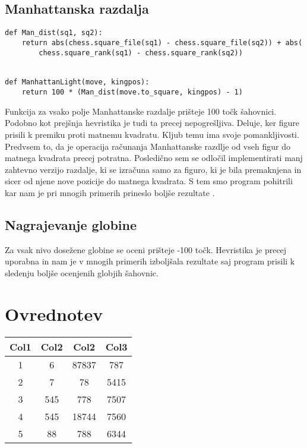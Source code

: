 \documentclass[runningheads]{llncs}
\begin{document}
\subsection{Manhattanska razdalja}
\begin{lstlisting}
def Man_dist(sq1, sq2):
    return abs(chess.square_file(sq1) - chess.square_file(sq2)) + abs(
        chess.square_rank(sq1) - chess.square_rank(sq2))


def ManhattanLight(move, kingpos):
    return 100 * (Man_dist(move.to_square, kingpos) - 1)
\end{lstlisting}
Funkcija za vsako polje Manhattanske razdalje prišteje 100 točk šahovnici. Podobno kot prejšnja hevristika je tudi ta precej nepogrešljiva. Deluje, ker figure prisili k premiku proti matnemu kvadratu. Kljub temu ima svoje pomankljivosti. Predvsem to, da je operacija računanja Manhattanske razdlje od vseh figur do matnega kvadrata precej potratna. Posledično sem se odločil implementirati manj zahtevno verzijo razdalje, ki se izračuna samo za figuro, ki je bila premaknjena in sicer od njene nove pozicije do matnega kvadrata. S tem smo program pohitrili kar nam je pri mnogih primerih prineslo boljše rezultate \cite{janko2015razvoj}.
\\
\subsection{Nagrajevanje globine}
Za vsak nivo dosežene globine se oceni prišteje -100 točk. Hevristika je precej uporabna in nam je v mnogih primerih izboljšala rezultate saj program prisili k sledenju boljše ocenjenih globjih šahovnic.

\section{Ovrednotev}
\begin{center}
 \begin{tabular}{||c c c c||} 
 \hline
 Col1 & Col2 & Col2 & Col3 \\ [0.5ex] 
 \hline\hline
 1 & 6 & 87837 & 787 \\ 
 \hline
 2 & 7 & 78 & 5415 \\
 \hline
 3 & 545 & 778 & 7507 \\
 \hline
 4 & 545 & 18744 & 7560 \\
 \hline
 5 & 88 & 788 & 6344 \\ [1ex] 
 \hline
\end{tabular}
\end{center}
\end{document}
